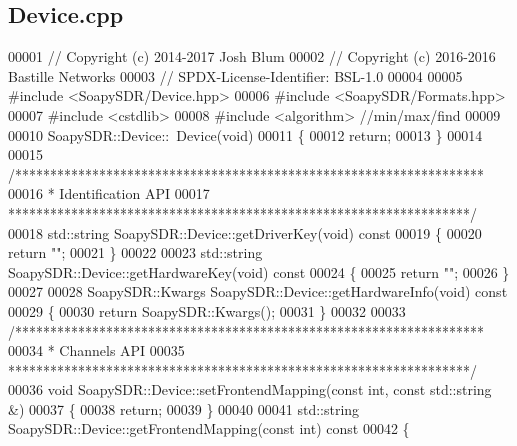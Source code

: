 \subsection{Device.\+cpp}
\label{Device_8cpp_source}

\begin{DoxyCode}
00001 \textcolor{comment}{// Copyright (c) 2014-2017 Josh Blum}
00002 \textcolor{comment}{// Copyright (c) 2016-2016 Bastille Networks}
00003 \textcolor{comment}{// SPDX-License-Identifier: BSL-1.0}
00004 
00005 \textcolor{preprocessor}{#include <SoapySDR/Device.hpp>}
00006 \textcolor{preprocessor}{#include <SoapySDR/Formats.hpp>}
00007 \textcolor{preprocessor}{#include <cstdlib>}
00008 \textcolor{preprocessor}{#include <algorithm>} \textcolor{comment}{//min/max/find}
00009 
00010 SoapySDR::Device::~Device(\textcolor{keywordtype}{void})
00011 \{
00012     \textcolor{keywordflow}{return};
00013 \}
00014 
00015 \textcolor{comment}{/*******************************************************************}
00016 \textcolor{comment}{ * Identification API}
00017 \textcolor{comment}{ ******************************************************************/}
00018 std::string SoapySDR::Device::getDriverKey(\textcolor{keywordtype}{void})\textcolor{keyword}{ const}
00019 \textcolor{keyword}{}\{
00020     \textcolor{keywordflow}{return} \textcolor{stringliteral}{""};
00021 \}
00022 
00023 std::string SoapySDR::Device::getHardwareKey(\textcolor{keywordtype}{void})\textcolor{keyword}{ const}
00024 \textcolor{keyword}{}\{
00025     \textcolor{keywordflow}{return} \textcolor{stringliteral}{""};
00026 \}
00027 
00028 SoapySDR::Kwargs SoapySDR::Device::getHardwareInfo(\textcolor{keywordtype}{void})\textcolor{keyword}{ const}
00029 \textcolor{keyword}{}\{
00030     \textcolor{keywordflow}{return} SoapySDR::Kwargs();
00031 \}
00032 
00033 \textcolor{comment}{/*******************************************************************}
00034 \textcolor{comment}{ * Channels API}
00035 \textcolor{comment}{ ******************************************************************/}
00036 \textcolor{keywordtype}{void} SoapySDR::Device::setFrontendMapping(\textcolor{keyword}{const} \textcolor{keywordtype}{int}, \textcolor{keyword}{const} std::string &)
00037 \{
00038     \textcolor{keywordflow}{return};
00039 \}
00040 
00041 std::string SoapySDR::Device::getFrontendMapping(\textcolor{keyword}{const} \textcolor{keywordtype}{int})\textcolor{keyword}{ const}
00042 \textcolor{keyword}{}\{

\end{DoxyCode}
